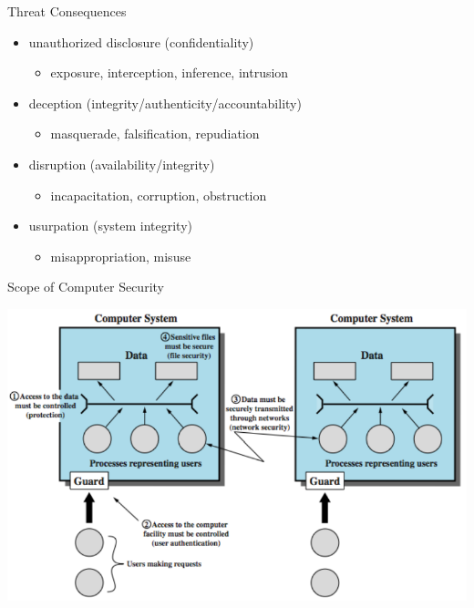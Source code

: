 \documentclass{beamer}
\begin{document}
\begin{frame}{Threat Consequences}
  \begin{itemize}
    \item unauthorized disclosure (confidentiality) 
      \begin{itemize}
        \item exposure, interception, inference, intrusion 
        \end{itemize}
      \end{itemize}
  \begin{itemize}
    \item deception (integrity/authenticity/accountability)
      \begin{itemize}
        \item masquerade, falsification, repudiation 
        \end{itemize}
      \end{itemize}
  \begin{itemize}
    \item disruption (availability/integrity)
      \begin{itemize}
        \item incapacitation, corruption, obstruction 
        \end{itemize}
      \end{itemize}
  \begin{itemize}
    \item usurpation (system integrity)
      \begin{itemize}
      \item misappropriation, misuse
      \end{itemize}
    \end{itemize}
\end{frame}

\begin{frame}{Scope of Computer Security}
  \begin{center}
    \includegraphics[width=0.8\linewidth]{securityScope}
  \end{center}
\end{frame}
\end{document}
